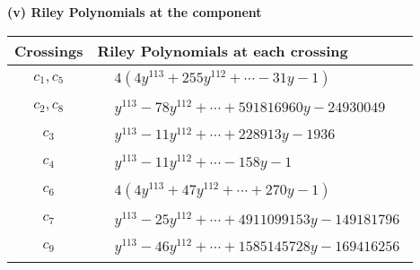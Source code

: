 \documentclass[1p]{elsarticle_modified}
\theoremstyle{definition}
\begin{document}
\newpage\renewcommand{\arraystretch}{1}
\flushleft \textbf{(v) Riley Polynomials at the component}\newline \\
\begin{tabular}{m{50pt}|m{274pt}}
Crossings & \hspace{64pt}Riley Polynomials at each crossing \\
\hline $$\begin{aligned}c_{1},c_{5}\end{aligned}$$&$\begin{aligned}
&4(4 y^{113}+255 y^{112}+\cdots-31 y-1)
\end{aligned}$\\
\hline $$\begin{aligned}c_{2},c_{8}\end{aligned}$$&$\begin{aligned}
&y^{113}-78 y^{112}+\cdots+591816960 y-24930049
\end{aligned}$\\
\hline $$\begin{aligned}c_{3}\end{aligned}$$&$\begin{aligned}
&y^{113}-11 y^{112}+\cdots+228913 y-1936
\end{aligned}$\\
\hline $$\begin{aligned}c_{4}\end{aligned}$$&$\begin{aligned}
&y^{113}-11 y^{112}+\cdots-158 y-1
\end{aligned}$\\
\hline $$\begin{aligned}c_{6}\end{aligned}$$&$\begin{aligned}
&4(4 y^{113}+47 y^{112}+\cdots+270 y-1)
\end{aligned}$\\
\hline $$\begin{aligned}c_{7}\end{aligned}$$&$\begin{aligned}
&y^{113}-25 y^{112}+\cdots+4911099153 y-149181796
\end{aligned}$\\
\hline $$\begin{aligned}c_{9}\end{aligned}$$&$\begin{aligned}
&y^{113}-46 y^{112}+\cdots+1585145728 y-169416256
\end{aligned}$\\

\end{tabular}
\end{document}

